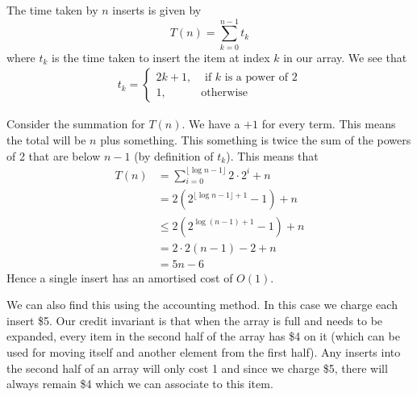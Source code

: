 The time taken by $n$ inserts is given by
$$ T(n) = \sum_{k = 0}^{n - 1} t_k $$
where $t_k$ is the time taken to insert the item at index $k$ in our array. We see that
\begin{align*}
    t_k = 
    \begin{cases}
        2k + 1, &\text{ if $k$ is a power of 2}\\
        1, &\text{otherwise}
    \end{cases}
\end{align*}

Consider the summation for $T(n)$. We have a $+1$ for every term. This means the total will be $n$ plus something. This something is twice the sum of the powers of 2 that are below $n - 1$ (by definition of $t_k$). This means that
\begin{align*}
    T(n) &= \sum_{i = 0}^{\lfloor \log n - 1 \rfloor} 2 \cdot 2^{i} + n\\
    &= 2 (2^{\lfloor \log n - 1 \rfloor + 1} - 1) + n\\
    &\leq 2 (2^{\log (n - 1) + 1} - 1) + n\\
    &= 2 \cdot 2(n - 1) - 2 + n\\
    &= 5n - 6
\end{align*}
Hence a single insert has an amortised cost of $O(1)$.

We can also find this using the accounting method. In this case we charge each insert \$5. Our credit invariant is that when the array is full and needs to be expanded, every item in the second half of the array has \$4 on it (which can be used for moving itself and another element from the first half). Any inserts into the second half of an array will only cost 1 and since we charge \$5, there will always remain \$4 which we can associate to this item.